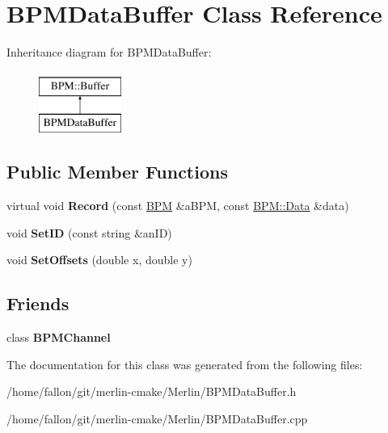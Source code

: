 \hypertarget{classBPMDataBuffer}{}\section{B\+P\+M\+Data\+Buffer Class Reference}
\label{classBPMDataBuffer}
Inheritance diagram for B\+P\+M\+Data\+Buffer\+:\begin{figure}[H]
\begin{center}
\leavevmode
\includegraphics[height=2.000000cm]{classBPMDataBuffer}
\end{center}
\end{figure}
\subsection*{Public Member Functions}
\begin{DoxyCompactItemize}
\item 
\mbox{\label{classBPMDataBuffer_a8710bff1ff2db1bc54d93f92d8ceb7bf}} 
virtual void {\bfseries Record} (const \hyperlink{classBPM}{B\+PM} \&a\+B\+PM, const \hyperlink{structBPM_1_1Data}{B\+P\+M\+::\+Data} \&data)
\item 
\mbox{\label{classBPMDataBuffer_af220d26561b1e99b443bde1131702066}} 
void {\bfseries Set\+ID} (const string \&an\+ID)
\item 
\mbox{\label{classBPMDataBuffer_ab0767c41e8d3eae8277fdc6b193269d0}} 
void {\bfseries Set\+Offsets} (double x, double y)
\end{DoxyCompactItemize}
\subsection*{Friends}
\begin{DoxyCompactItemize}
\item 
\mbox{\label{classBPMDataBuffer_a7d383da5b53613d4683641b8bd04620c}} 
class {\bfseries B\+P\+M\+Channel}
\end{DoxyCompactItemize}


The documentation for this class was generated from the following files\+:\begin{DoxyCompactItemize}
\item 
/home/fallon/git/merlin-\/cmake/\+Merlin/B\+P\+M\+Data\+Buffer.\+h\item 
/home/fallon/git/merlin-\/cmake/\+Merlin/B\+P\+M\+Data\+Buffer.\+cpp\end{DoxyCompactItemize}
